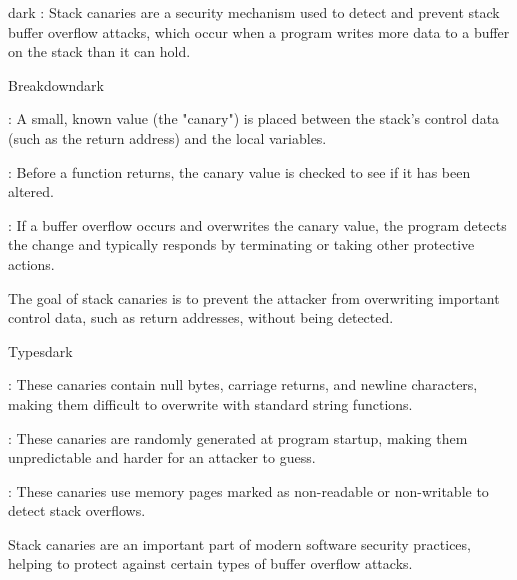 \label{Stack Canaries}
\begin{baseBoxThree}{}{dark}
    \bigskip
    : Stack canaries are a security mechanism used to detect and prevent stack buffer overflow attacks, which occur when a program writes more data to a buffer on the stack than it can hold.
    \bigskip
    \begin{baseBoxThree}{Breakdown}{dark}
        \smallskip
        \begin{posnexItemize}
            \item[\sA] : A small, known value (the "canary") is placed between the stack's control data (such as the return address) and the local variables.
            \item[\sA] : Before a function returns, the canary value is checked to see if it has been altered.
            \item[\sA] : If a buffer overflow occurs and overwrites the canary value, the program detects the change and typically responds by terminating or taking other protective actions.
        \end{posnexItemize}
        \smallskip
        The goal of stack canaries is to prevent the attacker from overwriting important control data, such as return addresses, without being detected.
        \smallskip
    \end{baseBoxThree}
    \smallskip
    \begin{baseBoxThree}{Types}{dark}
        \smallskip
        \begin{posnexItemize}
            \item[\sA] : These canaries contain null bytes, carriage returns, and newline characters, making them difficult to overwrite with standard string functions.
            \item[\sA] : These canaries are randomly generated at program startup, making them unpredictable and harder for an attacker to guess.
            \item[\sA] : These canaries use memory pages marked as non-readable or non-writable to detect stack overflows.
        \end{posnexItemize}
        \smallskip
        Stack canaries are an important part of modern software security practices, helping to protect against certain types of buffer overflow attacks.
        \smallskip
    \end{baseBoxThree}
    \smallskip
\end{baseBoxThree}

